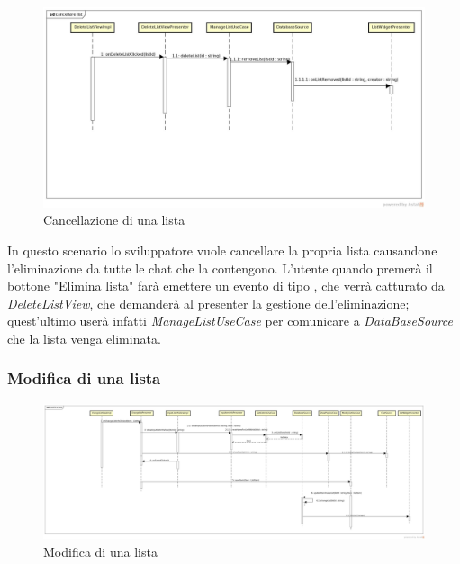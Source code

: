 \label{Cancellazione di una lista}
\begin{figure}[H]
	\centering
	\includegraphics[width=\textwidth]{Sezioni/Diagrammi/App/cancellare_lista.jpg}
	\caption{Cancellazione di una lista}
\end{figure}

In questo scenario lo sviluppatore vuole cancellare la propria lista causandone l'eliminazione da tutte le chat che la contengono. L'utente quando premerà il bottone "Elimina lista" farà emettere un evento di tipo , che verrà catturato da \textit{DeleteListView}, che demanderà al presenter la gestione dell'eliminazione; quest'ultimo userà infatti \textit{ManageListUseCase} per comunicare a \textit{DataBaseSource} che la lista venga eliminata.

\subsubsection{Modifica di una lista}

\label{Modifca di un lista}
\begin{figure}[H]
	\centering
	\includegraphics[width=\textwidth]{Sezioni/Diagrammi/App/modifica_lista.jpg}
	\caption{Modifica di una lista}
\end{figure}

